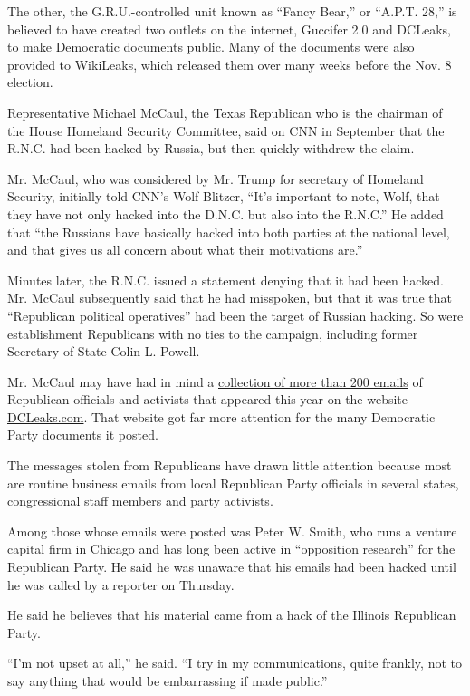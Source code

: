The other, the G.R.U.-controlled unit known as ``Fancy Bear,'' or
``A.P.T. 28,'' is believed to have created two outlets on the internet,
Guccifer 2.0 and DCLeaks, to make Democratic documents public. Many of
the documents were also provided to WikiLeaks, which released them over
many weeks before the Nov. 8 election.

Representative Michael McCaul, the Texas Republican who is the chairman
of the House Homeland Security Committee, said on CNN in September that
the R.N.C. had been hacked by Russia, but then quickly withdrew the
claim.

Mr. McCaul, who was considered by Mr. Trump for secretary of Homeland
Security, initially told CNN's Wolf Blitzer, ``It's important to note,
Wolf, that they have not only hacked into the D.N.C. but also into the
R.N.C.'' He added that ``the Russians have basically hacked into both
parties at the national level, and that gives us all concern about what
their motivations are.''

Minutes later, the R.N.C. issued a statement denying that it had been
hacked. Mr. McCaul subsequently said that he had misspoken, but that it
was true that ``Republican political operatives'' had been the target of
Russian hacking. So were establishment Republicans with no ties to the
campaign, including former Secretary of State Colin L. Powell.

Mr. McCaul may have had in mind a
\href{http://dcleaks.com/index.php/the-united-states-republican-party/}{collection
of more than 200 emails} of Republican officials and activists that
appeared this year on the website
\href{http://dcleaks.com/}{DCLeaks.com}. That website got far more
attention for the many Democratic Party documents it posted.

The messages stolen from Republicans have drawn little attention because
most are routine business emails from local Republican Party officials
in several states, congressional staff members and party activists.

Among those whose emails were posted was Peter W. Smith, who runs a
venture capital firm in Chicago and has long been active in ``opposition
research'' for the Republican Party. He said he was unaware that his
emails had been hacked until he was called by a reporter on Thursday.

He said he believes that his material came from a hack of the Illinois
Republican Party.

``I'm not upset at all,'' he said. ``I try in my communications, quite
frankly, not to say anything that would be embarrassing if made
public.''

